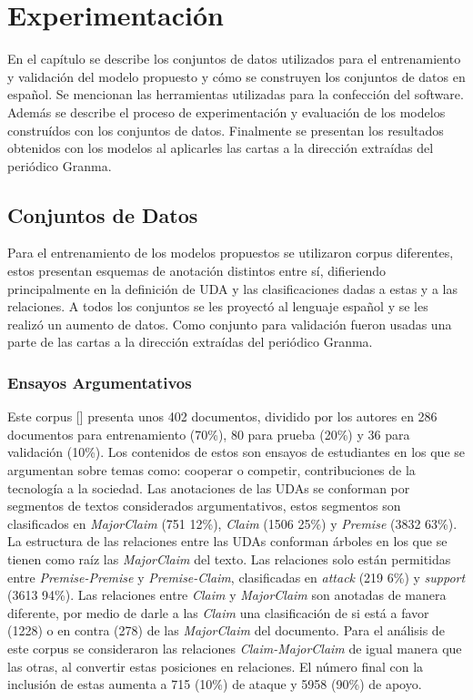 \chapter{Experimentación}\label{chapter:implementation}

En el capítulo se describe los conjuntos de datos utilizados para el entrenamiento y validación del modelo 
propuesto y cómo se construyen los conjuntos de datos en español. Se mencionan las herramientas utilizadas 
para la confección del software. Además se describe el 
proceso de experimentación y evaluación de los modelos construídos con los conjuntos de datos. Finalmente
se presentan los resultados obtenidos con los modelos al aplicarles las cartas a la dirección extraídas 
del periódico Granma. 

\section{Conjuntos de Datos}

Para el entrenamiento de los modelos propuestos se utilizaron corpus diferentes, estos
presentan esquemas de anotación distintos entre sí, difieriendo principalmente en la definición de UDA y 
las clasificaciones dadas a estas y a las relaciones. A todos los conjuntos se les proyectó al lenguaje 
español y se les realizó un aumento de datos. Como conjunto para validación fueron usadas 
una parte de las cartas a la dirección extraídas del periódico Granma.

\subsection{Ensayos Argumentativos}\label{corpus:persuasive_essays}

Este corpus [\cite{stab2017parsing}] presenta unos 402 documentos, dividido por los autores en 286 documentos para entrenamiento (70\%), 
80 para prueba (20\%) y 36 para validación (10\%). Los contenidos de estos son ensayos de estudiantes en los que 
se argumentan sobre temas como: cooperar o competir, contribuciones de la tecnología a la sociedad.
Las anotaciones de las UDAs se conforman por segmentos de textos considerados argumentativos, estos segmentos son 
clasificados en \emph{MajorClaim} (751 12\%), \emph{Claim} (1506 25\%) y \emph{Premise} (3832 63\%).
La estructura de las relaciones entre las UDAs conforman árboles en los que se tienen como raíz las 
\emph{MajorClaim} del texto. Las relaciones solo están permitidas entre \emph{Premise-Premise} y \emph{Premise-Claim}, clasificadas
en \emph{attack} (219 6\%) y \emph{support} (3613 94\%). Las relaciones entre \emph{Claim} y \emph{MajorClaim} son anotadas 
de manera diferente, por medio de 
darle a las \emph{Claim} una clasificación de si está a favor (1228) o en contra (278) de las \emph{MajorClaim} del documento.
Para el análisis de este corpus se consideraron las relaciones \emph{Claim-MajorClaim} de igual manera que las otras,
al convertir estas posiciones en relaciones. El número final con la inclusión de estas aumenta a 715 (10\%) de ataque y 
5958 (90\%) de apoyo.

